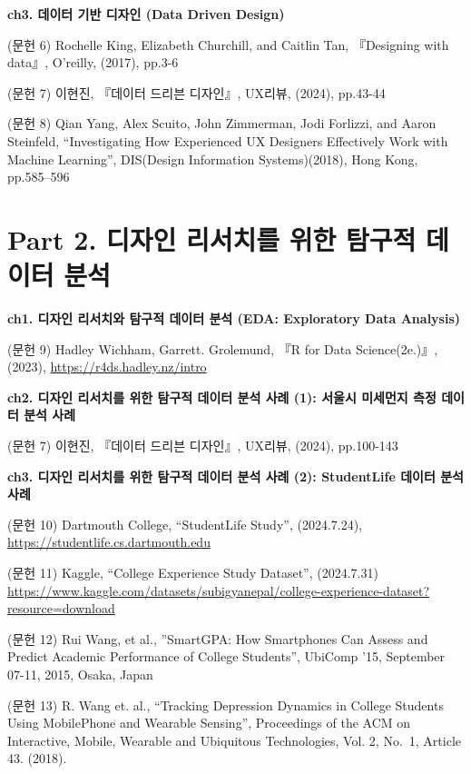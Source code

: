 \documentclass[
  letterpaper,
]{book}
\begin{document}
\textbf{ch3. 데이터 기반 디자인 (Data Driven Design)}

(문헌 6) Rochelle King, Elizabeth Churchill, and Caitlin Tan,
『Designing with data』, O'reilly, (2017), pp.3-6

(문헌 7) 이현진, 『데이터 드리븐 디자인』, UX리뷰, (2024), pp.43-44

(문헌 8) Qian Yang, Alex Scuito, John Zimmerman, Jodi Forlizzi, and
Aaron Steinfeld, ``Investigating How Experienced UX Designers
Effectively Work with Machine Learning'', DIS(Design Information
Systems)(2018), Hong Kong, pp.585--596

\section*{Part 2. 디자인 리서치를 위한 탐구적 데이터
분석}\label{part-2.-uxb514uxc790uxc778-uxb9acuxc11cuxce58uxb97c-uxc704uxd55c-uxd0d0uxad6cuxc801-uxb370uxc774uxd130-uxbd84uxc11d-2}


\textbf{ch1. 디자인 리서치와 탐구적 데이터 분석 (EDA: Exploratory Data
Analysis)}

(문헌 9) Hadley Wichham, Garrett. Grolemund, 『R for Data
Science(2e.)』, (2023), \url{https://r4ds.hadley.nz/intro}

\textbf{ch2. 디자인 리서치를 위한 탐구적 데이터 분석 사례 (1): 서울시
미세먼지 측정 데이터 분석 사례}

(문헌 7) 이현진, 『데이터 드리븐 디자인』, UX리뷰, (2024), pp.100-143

\textbf{ch3. 디자인 리서치를 위한 탐구적 데이터 분석 사례 (2):
StudentLife 데이터 분석 사례}

(문헌 10) Dartmouth College, ``StudentLife Study'', (2024.7.24),
\href{https://studentlife.cs.dartmouth.edu/}{https://studentlife.cs.dartmouth.edu}

(문헌 11) Kaggle, ``College Experience Study Dataset'', (2024.7.31)
\url{https://www.kaggle.com/datasets/subigyanepal/college-experience-dataset?resource=download}

(문헌 12) Rui Wang, et al., ''SmartGPA: How Smartphones Can Assess and
Predict Academic Performance of College Students'', UbiComp '15,
September 07-11, 2015, Osaka, Japan

(문헌 13) R. Wang et. al., ``Tracking Depression Dynamics in College
Students Using MobilePhone and Wearable Sensing'', Proceedings of the
ACM on Interactive, Mobile, Wearable and Ubiquitous Technologies, Vol.
2, No.~1, Article 43. (2018).
\end{document}
